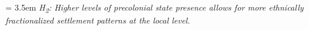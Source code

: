 \bigskip
\hangindent = 3.5em \textit{H\textsubscript{2}: Higher levels of precolonial
	state presence allows for more ethnically fractionalized settlement
patterns at the local level.}
\bigskip


% 




